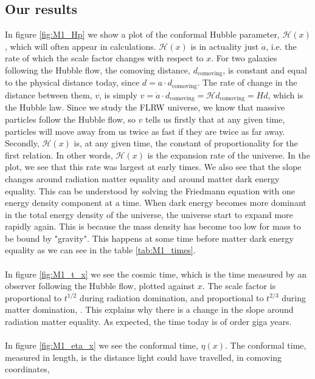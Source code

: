 \documentclass{aa}
\begin{document}
\subsection{Our results}



In figure \ref{fig:M1_Hp} we show a plot of the conformal Hubble parameter, $\mathcal{H}(x)$, which will often appear in calculations. $\mathcal{H}(x)$ is in actuality just $\dot{a}$, i.e. the rate of which the scale factor changes 
with respect to $x$. For two galaxies following the Hubble flow, the comoving distance, $d_\mathrm{comoving}$, is constant and equal to the physical distance today, since $d = a\cdot d_\mathrm{comoving}$.
The rate of change in the distance between them, $v$, is simply $v = \dot{a}\cdot d_\mathrm{comoving} = \mathcal{H}d_\mathrm{comoving} = Hd$, which is the Hubble law.
Since we study the FLRW universe, we know that massive particles follow the Hubble flow, so $v$ tells us firstly that at any given time, particles will move away from us 
twice as fast if they are twice as far away. Secondly, $\mathcal{H}(x)$ is, at any given time, the constant of proportionality for the first relation. In other words, $\mathcal{H}(x)$
is the expansion rate of the universe. In the plot, we see that this rate was largest at early times. We also see that the slope changes around radiation matter equality and around matter dark energy equality.
This can be understood by solving the Friedmann equation with one energy density component at a time. When dark energy becomes more dominant in the total energy density of the universe, the universe start to expand more rapidly again.
This is because the mass density has become too low for mass to be bound by "gravity". This happens at some time before matter dark energy equality as we can see
in the table \ref{tab:M1_times}.\\
\\
In figure \ref{fig:M1_t_x} we see the cosmic time, which is the time measured by an observer following the Hubble flow, plotted against $x$. The scale factor is proportional to $t^{1/2}$ during radiation domination, and proportional to $t^{2/3}$ during matter domination, \cite{Dodelson:MC}.
This explains why there is a change in the slope around radiation matter equality. As expected, the time today is of order giga years.\\
\\
In figure \ref{fig:M1_eta_x} we see the conformal time, $\eta(x)$. The conformal time, measured in length, is the distance light could have travelled, in comoving coordinates,
\end{document}
